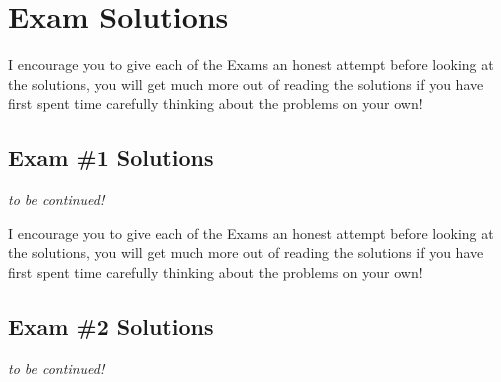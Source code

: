 \renewcommand{\thechapter}{ES}
\chapter*{Exam Solutions}
\addtocounter{chapter}{1} %
\setcounter{section}{0}

\vspace{-0.3in}
\begin{tcolorbox}
    I encourage you to give each of the Exams an honest attempt before looking at the solutions, you will get much more out of reading the solutions if you have first spent time carefully thinking about the problems on your own!
\end{tcolorbox}
\vspace{-0.2in}
\section{Exam \#1 Solutions}

\textit{to be continued!}

\newpage

\begin{tcolorbox}
    I encourage you to give each of the Exams an honest attempt before looking at the solutions, you will get much more out of reading the solutions if you have first spent time carefully thinking about the problems on your own!
\end{tcolorbox}
\vspace{-0.2in}
\section{Exam \#2 Solutions}
\textit{to be continued!}
